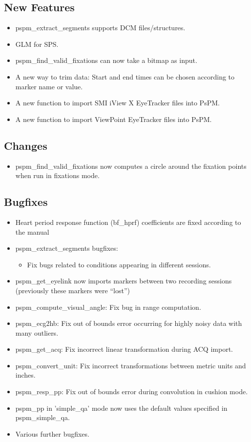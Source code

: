 \documentclass[english]{article}
\numberwithin{equation}{section}
\numberwithin{figure}{section}
\begin{document}
\subsection*{New Features}
\begin{itemize}
\item pspm\_extract\_segments supports DCM files/structures.
\item GLM for SPS.
\item pspm\_find\_valid\_fixations can now take a bitmap as input.
\item A new way to trim data: Start and end times can be chosen according
to marker name or value.
\item A new function to import SMI iView X EyeTracker files into PsPM.
\item A new function to import ViewPoint EyeTracker files into PsPM.
\end{itemize}

\subsection*{Changes}
\begin{itemize}
\item pspm\_find\_valid\_fixations now computes a circle around the fixation
points when run in fixations mode.
\end{itemize}

\subsection*{Bugfixes}
\begin{itemize}
\item Heart period response function (bf\_hprf) coefficients are fixed according
to the manual
\item pspm\_extract\_segments bugfixes:
\begin{itemize}
\item Fix bugs related to conditions appearing in different sessions.
\end{itemize}
\item pspm\_get\_eyelink now imports markers between two recording sessions
(previously these markers were ``lost'')
\item pspm\_compute\_visual\_angle: Fix bug in range computation.
\item pspm\_ecg2hb: Fix out of bounds error occurring for highly noisy data
with many outliers.
\item pspm\_get\_acq: Fix incorrect linear transformation during ACQ import.
\item pspm\_convert\_unit: Fix incorrect transformations between metric
units and inches.
\item pspm\_resp\_pp: Fix out of bounds error during convolution in cushion
mode.
\item pspm\_pp in 'simple\_qa' mode now uses the default values specified
in pspm\_simple\_qa.
\item Various further bugfixes.
\end{itemize}
\end{document}
